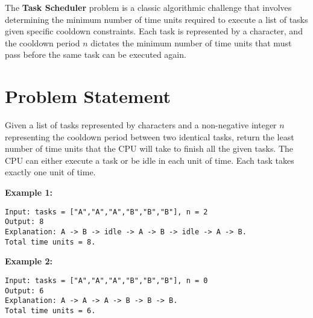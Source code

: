 
\label{problem:task_scheduler}

The \textbf{Task Scheduler} problem is a classic algorithmic challenge that involves determining the minimum number of time units required to execute a list of tasks given specific cooldown constraints. Each task is represented by a character, and the cooldown period \( n \) dictates the minimum number of time units that must pass before the same task can be executed again.

\section*{Problem Statement}

Given a list of tasks represented by characters and a non-negative integer \( n \) representing the cooldown period between two identical tasks, return the least number of time units that the CPU will take to finish all the given tasks. The CPU can either execute a task or be idle in each unit of time. Each task takes exactly one unit of time.

\textbf{Example 1:}
\begin{verbatim}
Input: tasks = ["A","A","A","B","B","B"], n = 2
Output: 8
Explanation: A -> B -> idle -> A -> B -> idle -> A -> B.
Total time units = 8.
\end{verbatim}

\textbf{Example 2:}
\begin{verbatim}
Input: tasks = ["A","A","A","B","B","B"], n = 0
Output: 6
Explanation: A -> A -> A -> B -> B -> B.
Total time units = 6.
\end{verbatim}



